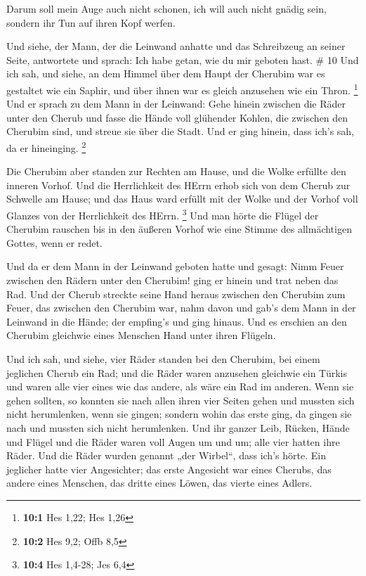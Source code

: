  Darum soll mein Auge auch nicht schonen, ich will auch
nicht gnädig sein, sondern ihr Tun auf ihren Kopf werfen.

 Und siehe, der Mann, der die Leinwand anhatte und das
Schreibzeug an seiner Seite, antwortete und sprach: Ich habe getan, wie
du mir geboten hast. \# 10  Und ich sah, und siehe, an dem
Himmel über dem Haupt der Cherubim war es gestaltet wie ein Saphir, und
über ihnen war es gleich anzusehen wie ein Thron. \footnote{\textbf{10:1}
  Hes 1,22; Hes 1,26}  Und er sprach zu dem Mann in der
Leinwand: Gehe hinein zwischen die Räder unter den Cherub und fasse die
Hände voll glühender Kohlen, die zwischen den Cherubim sind, und streue
sie über die Stadt. Und er ging hinein, dass ich's sah, da er
hineinging. \footnote{\textbf{10:2} Hes 9,2; Offb 8,5}

 Die Cherubim aber standen zur Rechten am Hause, und die
Wolke erfüllte den inneren Vorhof.  Und die Herrlichkeit des
HErrn erhob sich von dem Cherub zur Schwelle am Hause; und das Haus ward
erfüllt mit der Wolke und der Vorhof voll Glanzes von der Herrlichkeit
des HErrn. \footnote{\textbf{10:4} Hes 1,4-28; Jes 6,4}  Und
man hörte die Flügel der Cherubim rauschen bis in den äußeren Vorhof wie
eine Stimme des allmächtigen Gottes, wenn er redet.

 Und da er dem Mann in der Leinwand geboten hatte und
gesagt: Nimm Feuer zwischen den Rädern unter den Cherubim! ging er
hinein und trat neben das Rad.  Und der Cherub streckte
seine Hand heraus zwischen den Cherubim zum Feuer, das zwischen den
Cherubim war, nahm davon und gab's dem Mann in der Leinwand in die
Hände; der empfing's und ging hinaus.  Und es erschien an
den Cherubim gleichwie eines Menschen Hand unter ihren Flügeln.

 Und ich sah, und siehe, vier Räder standen bei den
Cherubim, bei einem jeglichen Cherub ein Rad; und die Räder waren
anzusehen gleichwie ein Türkis  und waren alle vier eines
wie das andere, als wäre ein Rad im anderen.  Wenn sie
gehen sollten, so konnten sie nach allen ihren vier Seiten gehen und
mussten sich nicht herumlenken, wenn sie gingen; sondern wohin das erste
ging, da gingen sie nach und mussten sich nicht herumlenken.
 Und ihr ganzer Leib, Rücken, Hände und Flügel und die
Räder waren voll Augen um und um; alle vier hatten ihre Räder.
 Und die Räder wurden genannt „der Wirbel``, dass ich's
hörte.  Ein jeglicher hatte vier Angesichter; das erste
Angesicht war eines Cherubs, das andere eines Menschen, das dritte eines
Löwen, das vierte eines Adlers.

